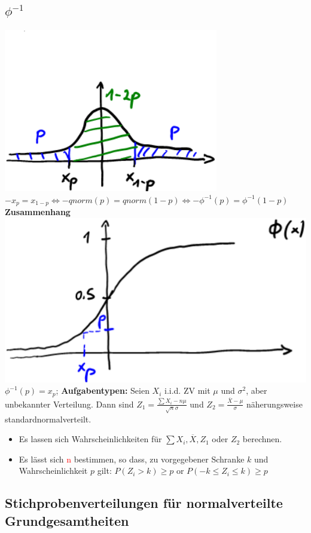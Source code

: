 \subsection{$\phi^{-1}$}
\includegraphics[scale=0.25]{./pic/ZGWPhi-1Verteilung.png} $  -x_{p} = x_{1-p} \Leftrightarrow -qnorm(p) = qnorm(1-p) \Leftrightarrow -\phi^{-1}(p) = \phi^{-1}(1-p) $
\textbf{Zusammenhang}
\includegraphics[scale=0.25]{./pic/ZGWSigmoidFunction.png} $ \phi^{-1}(p) = x_{p} $; 
\textbf{Aufgabentypen:} 
Seien $ X_{i} $ i.i.d. ZV mit $\mu$ und $ \sigma^2 $, aber unbekannter Verteilung. Dann sind $ Z_{1} = \frac{\sum X_{i}-n\mu}{\sqrt{n}\sigma}$ und $Z_{2} = \frac{\overline{X}-\mu}{\sigma} $  näherungsweise standardnormalverteilt.
\begin{itemize}
	\item Es lassen sich Wahrscheinlichkeiten für $\sum X_{i}, \overline{X}, Z_{1}$ oder $ Z_{2} $ berechnen.
	\item Es lässt sich \textcolor{red}{n} bestimmen, so dass, zu vorgegebener Schranke $ k $ und Wahrscheinlichkeit $ p $ gilt: $ P(Z_{i} > k) \geq p $ or $ P(-k \leq Z_{i} \leq k) \geq p $
\end{itemize}
\subsection{Stichprobenverteilungen für normalverteilte Grundgesamtheiten}
